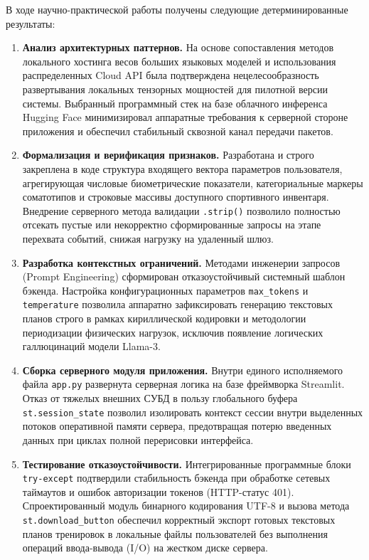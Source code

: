 \documentclass[14pt, a4paper]{extarticle}
\begin{document}
В ходе научно-практической работы получены следующие детерминированные результаты:
\begin{enumerate}
    \item \textbf{Анализ архитектурных паттернов.} На основе сопоставления методов локального хостинга весов больших языковых моделей и использования распределенных Cloud API была подтверждена нецелесообразность развертывания локальных тензорных мощностей для пилотной версии системы. Выбранный программный стек на базе облачного инференса Hugging Face минимизировал аппаратные требования к серверной стороне приложения и обеспечил стабильный сквозной канал передачи пакетов.
    \item \textbf{Формализация и верификация признаков.} Разработана и строго закреплена в коде структура входящего вектора параметров пользователя, агрегирующая числовые биометрические показатели, категориальные маркеры соматотипов и строковые массивы доступного спортивного инвентаря. Внедрение серверного метода валидации \texttt{.strip()} позволило полностью отсекать пустые или некорректно сформированные запросы на этапе перехвата событий, снижая нагрузку на удаленный шлюз.
    \item \textbf{Разработка контекстных ограничений.} Методами инженерии запросов (Prompt Engineering) сформирован отказоустойчивый системный шаблон бэкенда. Настройка конфигурационных параметров \texttt{max\_tokens} и \texttt{temperature} позволила аппаратно зафиксировать генерацию текстовых планов строго в рамках кириллической кодировки и методологии периодизации физических нагрузок, исключив появление логических галлюцинаций модели Llama-3.
    \item \textbf{Сборка серверного модуля приложения.} Внутри единого исполняемого файла \texttt{app.py} развернута серверная логика на базе фреймворка Streamlit. Отказ от тяжелых внешних СУБД в пользу глобального буфера \texttt{st.session\_state} позволил изолировать контекст сессии внутри выделенных потоков оперативной памяти сервера, предотвращая потерю введенных данных при циклах полной перерисовки интерфейса.
    \item \textbf{Тестирование отказоустойчивости.} Интегрированные программные блоки \texttt{try-except} подтвердили стабильность бэкенда при обработке сетевых таймаутов и ошибок авторизации токенов (HTTP-статус 401). Спроектированный модуль бинарного кодирования UTF-8 и вызова метода \texttt{st.download\_button} обеспечил корректный экспорт готовых текстовых планов тренировок в локальные файлы пользователей без выполнения операций ввода-вывода (I/O) на жестком диске сервера.
\end{enumerate}
\end{document}
